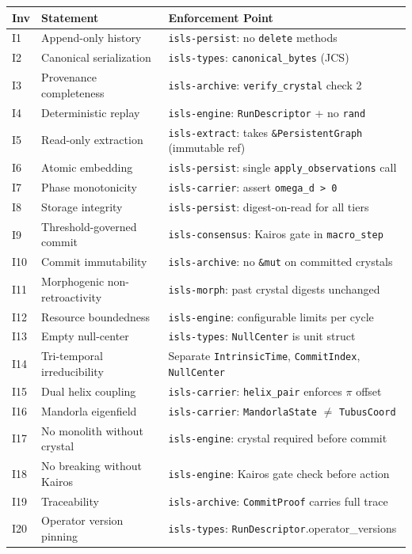 \documentclass[10pt,a4paper]{article}
\theoremstyle{definition}\newtheorem{definition}{Def}[section]
\theoremstyle{plain}\newtheorem{theorem}{Thm}[section]
\newcommand{\crate}[1]{\texttt{\small\color{rustborder!80!black}#1}}
\newcommand{\ty}[1]{\texttt{\small\color{accent}#1}}
\newcommand{\func}[1]{\texttt{\small\color{success}#1}}
\begin{document}
\begin{invbox}
\small
\begin{tabular}{l l l}
\toprule \textbf{Inv} & \textbf{Statement} & \textbf{Enforcement Point} \\
\midrule
I1 & Append-only history & \crate{isls-persist}: no \texttt{delete} methods \\
I2 & Canonical serialization & \crate{isls-types}: \func{canonical\_bytes} (JCS) \\
I3 & Provenance completeness & \crate{isls-archive}: \func{verify\_crystal} check 2 \\
I4 & Deterministic replay & \crate{isls-engine}: \ty{RunDescriptor} + no \texttt{rand} \\
I5 & Read-only extraction & \crate{isls-extract}: takes \texttt{\&PersistentGraph} (immutable ref) \\
I6 & Atomic embedding & \crate{isls-persist}: single \func{apply\_observations} call \\
I7 & Phase monotonicity & \crate{isls-carrier}: assert \texttt{omega\_d > 0} \\
I8 & Storage integrity & \crate{isls-persist}: digest-on-read for all tiers \\
I9 & Threshold-governed commit & \crate{isls-consensus}: Kairos gate in \func{macro\_step} \\
I10 & Commit immutability & \crate{isls-archive}: no \texttt{\&mut} on committed crystals \\
I11 & Morphogenic non-retroactivity & \crate{isls-morph}: past crystal digests unchanged \\
I12 & Resource boundedness & \crate{isls-engine}: configurable limits per cycle \\
I13 & Empty null-center & \crate{isls-types}: \ty{NullCenter} is unit struct \\
I14 & Tri-temporal irreducibility & Separate \ty{IntrinsicTime}, \ty{CommitIndex}, \ty{NullCenter} \\
I15 & Dual helix coupling & \crate{isls-carrier}: \func{helix\_pair} enforces $\pi$ offset \\
I16 & Mandorla eigenfield & \crate{isls-carrier}: \ty{MandorlaState} $\neq$ \ty{TubusCoord} \\
I17 & No monolith without crystal & \crate{isls-engine}: crystal required before commit \\
I18 & No breaking without Kairos & \crate{isls-engine}: Kairos gate check before action \\
I19 & Traceability & \crate{isls-archive}: \ty{CommitProof} carries full trace \\
I20 & Operator version pinning & \crate{isls-types}: \ty{RunDescriptor}.operator\_versions \\
\bottomrule
\end{tabular}
\end{invbox}
\end{document}
